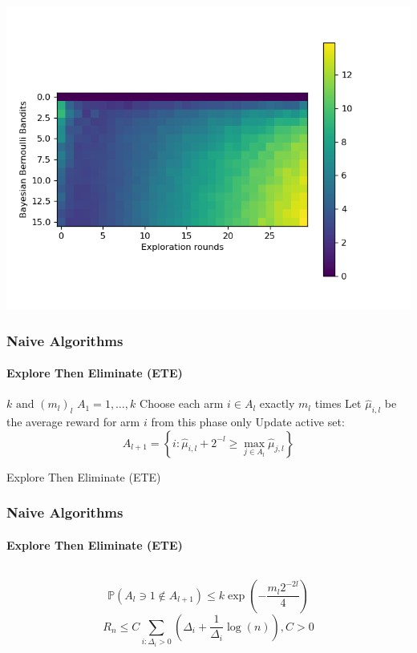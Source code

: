 \documentclass[12pt, aspectratio=169, mathserif]{beamer}
\begin{document}
  \begin{frame}[t]
    \vspace{-1cm}
    \begin{center}
      \includegraphics[height=1.1\textheight]{Figure 6.png}
    \end{center}
  \end{frame}
  \begin{frame}[t]
    \frametitle{Naive Algorithms}
    \framesubtitle{Explore Then Eliminate (ETE)}
    \begin{algorithm}[H]
      \begin{algorithmic}[1]
        \REQUIRE $k \text{ and } (m_l)_l$
        \STATE $A_1 = {1, \ldots, k}$
          \STATE Choose each arm $i\in A_l$ exactly $m_l$ times
          \STATE Let $\hat{\mu}_{i,l}$ be the average reward for arm $i$ from 
          this phase only
          \STATE Update active set:
          \begin{equation*}
            A_{l + 1} = \left\{i:\hat{\mu}_{i,l} + 2^{-l}\geq\max_{j\in A_l}\hat{\mu}_{j,l}\right\}
          \end{equation*}
        \ENDFOR
      \end{algorithmic}
      \caption{Explore Then Eliminate (ETE)}
      \label{alg:seq2}
    \end{algorithm}
  \end{frame}
  \begin{frame}[t]
    \frametitle{Naive Algorithms}
    \framesubtitle{Explore Then Eliminate (ETE)}
    \begin{columns}
      \begin{column}{0.5\textwidth}
        \begin{equation*}
          \mathbb{P}(A_l\ni 1 \notin A_{l + 1}) \leq k\exp\left(-\frac{m_l2^{-2l}}{4}\right)
        \end{equation*}
        \begin{equation*}
          R_n\leq C\sum_{i:\Delta_i>0}\left(\Delta_i + \frac{1}{\Delta_i}\log(n)\right), C>0
        \end{equation*}
      \end{column}
    \end{columns}
  \end{frame}
\end{document}
